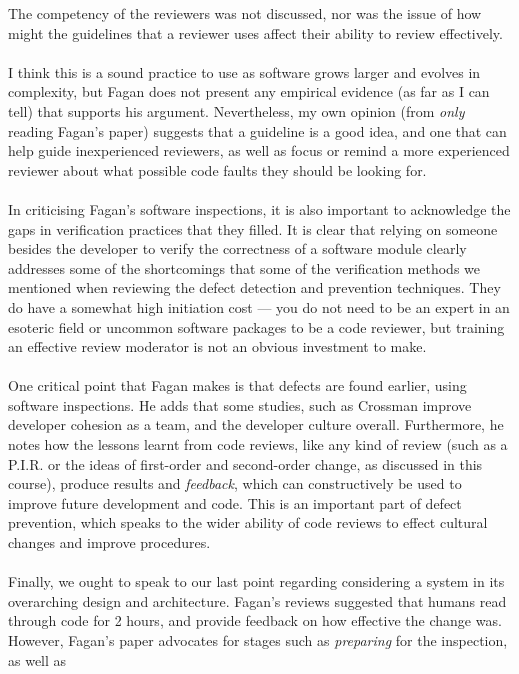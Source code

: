 The competency of the reviewers was not discussed, nor was the issue of how might the guidelines
that a reviewer uses affect their ability to review effectively.\\
\\
I think this is a sound practice to use as software grows larger and evolves in complexity, but
Fagan does not present any empirical evidence (as far as I can tell) that supports his argument.
Nevertheless, my own opinion (from {\em only} reading Fagan's paper) suggests that a guideline is a
good idea, and one that can help guide inexperienced reviewers, as well as focus or remind a more
experienced reviewer about what possible code faults they should be looking for.\\
\\
In criticising Fagan's software inspections, it is also important to acknowledge the gaps in
verification practices that they filled.
It is clear that relying on someone besides the developer to verify the correctness of a software
module clearly addresses some of the shortcomings that some of the verification methods we mentioned
when reviewing the defect detection and prevention techniques.
They do have a somewhat high initiation cost --- you do not need to be an expert in an esoteric field
or uncommon software packages to be a code reviewer, but training an effective review moderator is
not an obvious investment to make.\\
\\
One critical point that Fagan makes is that defects are found earlier, using software inspections.
He adds that some studies, such as Crossman \cite{crossman1977some} improve developer cohesion as a
team, and the developer culture overall.
Furthermore, he notes how the lessons learnt from code reviews, like any kind of review (such as a
P.I.R. or the ideas of first-order and second-order change, as discussed in this course), produce
results and {\em feedback}, which can constructively be used to improve future development and code.
This is an important part of defect prevention, which speaks to the wider ability of code reviews to
effect cultural changes and improve procedures.\\
\\
Finally, we ought to speak to our last point regarding considering a system in its overarching
design and architecture.
Fagan's reviews suggested that humans read through code for 2 hours, and provide feedback on how
effective the change was.
However, Fagan's paper advocates for stages such as {\em preparing} for the inspection, as well as

